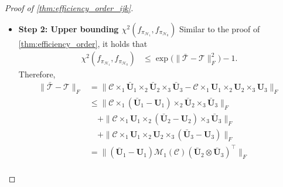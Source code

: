 \documentclass[10pt]{article}
\newcommand{\0}{{\mathbf{0}}}
\newcommand{\1}{{\mathbf{1}}}
\newcommand{\U}{{\mathbf{U}}}
\renewcommand{\t}{^{\top}}
\newcommand{\eps}{\varepsilon}
\begin{document}
\begin{proof}[Proof of \cref{thm:efficiency_order_ijk}]
\begin{itemize}
    Combining our bounds and plugging this inequality into \eqref{incoherence}, we have that
    \begin{align*}
        \| \mathbf{\bar U}_k \|_{2,\infty} &\leq \frac{\mu_0}{2} \sqrt{\frac{r_k}{p_k}} + \frac{\eps\sqrt{r_k}}{\lambda} + \bigg( \frac{\mu_0}{2} \sqrt{\frac{r_k}{p_k}} + \frac{\eps\sqrt{r_k}}{\lambda} \bigg) \frac{2\eps^2 r_k}{\lambda^2} \\
        &\leq  \frac{\mu_0}{2} \sqrt{\frac{r_k}{p_k}} + \frac{\eps\sqrt{r_k} }{\lambda/\sigma} +  \bigg( \frac{\mu_0}{2} \sqrt{\frac{r_k}{p_k}} + \frac{\eps \sqrt{r_k}}{\lambda/\sigma} \bigg) \frac{2\eps^2 r_k}{(\lambda/\sigma)^2} \\
        &\leq \frac{\mu_0}{2} \sqrt{\frac{r_k}{p_k}} + \frac{\eps\sqrt{r_k} }{C_0 \sqrt{p_k}} +  \bigg( \frac{\mu_0}{2} \sqrt{\frac{r_k}{p_k}} + \frac{\eps\sqrt{r_k}}{C_0 \sqrt{p_k}} \bigg) \frac{2\eps^2 r_k}{C_0^2 p_k} \\
&\leq\mu_0\sqrt{\frac{r_k}{p_k}},
    \end{align*}
    where the final inequality holds for $\eps$ sufficiently small, the second inequality holds from the fact that $\sigma \geq \sigma_{\min} = 1$, and the penultimate inequality holds from the assumption $\lambda/\sigma \geq C_0 \kappa r_{\max} \sqrt{p_{\max}}$.  
    \item \textbf{Step 2: Upper bounding $\chi^2(f_{{\pi_{\mathcal{H}_1}}},f_{{\pi_{\mathcal{H}_0}}})$} Similar to the proof of \cref{thm:efficiency_order}, it holds that
\begin{align*}
    \chi^2 ( f_{{\pi_{\mathcal{H}_1}}}, f_{\pi_{\mathcal{H}_0}}) &\leq \exp\bigg( \| \mathcal{\bar T} - \mathcal{T} \|_F^2 \bigg) - 1.
\end{align*}
Therefore,
\begin{align*}
    \| \mathcal{\bar T - \mathcal{T}} \|_F &= \| \mathcal{C} \times_1 \mathbf{\bar U}_1 \times_2 \mathbf{\bar U}_2 \times_3 \mathbf{\bar U}_3 - \mathcal{C} \times_1 \U_1 \times_2 \U_2 \times_3 \U_3 \|_F \\
    &\leq \| \mathcal{C} \times_1 (\mathbf{\bar U}_1 - \U_1) \times_2 \mathbf{\bar U}_2 \times_3 \mathbf{\bar U}_3 \|_F \\
    &\quad + \| \mathcal{C} \times_1 \U_1 \times_2 (\mathbf{\bar U}_2 - \U_2) \times_3 \mathbf{\bar U}_3 \|_F \\
    &\quad + \| \mathcal{C} \times_1 \U_1 \times_2 \U_2 \times_3 ( \mathbf{\bar U}_3 - \U_3) \|_F \\
    &= \| (\mathbf{\bar U}_1 - \U_1) \mathcal{M}_1(\mathcal{C}) (\mathbf{\bar U}_2 \otimes \mathbf{\bar U}_3)\t \|_F \\

\end{align*}
\end{itemize}
\end{proof}
\end{document}
